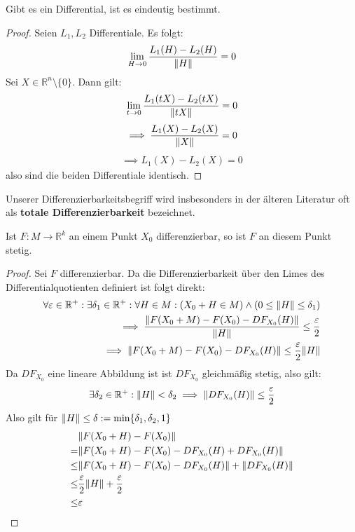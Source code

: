\documentclass{report}
\renewcommand\epsilon{\varepsilon}
\newcommand{\tbf}[1]{\textbf{#1}}
\newcommand{\bR}{\mathbb{R}}
\begin{document}
\begin{theorem}
 Gibt es ein Differential, ist es eindeutig bestimmt.
\end{theorem}
\begin{proof}
 Seien $L_1, L_2$ Differentiale. Es folgt:
 \begin{align*}
  \lim_{H \to 0} \frac{L_1(H) - L_2(H)}{\norm{H}} = 0
 \end{align*}
 Sei $X \in \bR^n \setminus \{0\}$. Dann gilt:
 \begin{align*}
  \lim_{t \to 0} \frac{L_1(tX) - L_2(tX)}{\norm{tX}} = 0
 \end{align*}
 \begin{align*}
  \implies \frac{L_1(X) - L_2(X)}{\norm{X}} = 0
 \end{align*}
 \begin{align*}
  \implies L_1(X) - L_2(X) = 0
 \end{align*}
 also sind die beiden Differentiale identisch.
\end{proof}
\begin{anmerkung}
 Unserer Differenzierbarkeitsbegriff wird insbesonders in der älteren Literatur oft als \tbf{totale Differenzierbarkeit} bezeichnet.
\end{anmerkung}
\begin{theorem}
 Ist $F: M \to \bR^k$ an einem Punkt $X_0$ differenzierbar, so ist $F$ an diesem Punkt stetig.
\end{theorem}
\begin{proof}
 Sei $F$ differenzierbar. Da die Differenzierbarkeit über den Limes des Differentialquotienten definiert ist folgt direkt:
 \begin{align*}
  \forall \epsilon \in \bR^+ : \exists \delta_1 \in \bR^+ : \forall H \in M : (X_0 + H \in M) \wedge (0 \leq \norm{H} \leq \delta_1)\\ 
  \implies \frac{\norm{F(X_0 + M) - F(X_0) - DF_{X_0}(H)}}{\norm{H}} \leq \frac{\epsilon}{2}\\
  \implies \norm{F(X_0 + M) - F(X_0) - DF_{X_0}(H)} \leq \frac{\epsilon}{2}\norm{H}\\
 \end{align*}
 Da $DF_{X_0}$ eine lineare Abbildung ist ist $DF_{X_0}$ gleichmäßig stetig, also gilt:
 \begin{align*}
  \exists \delta_2 \in \bR^+ : \norm{H} < \delta_2 \implies \norm{DF_{X_0}(H)} \leq \frac{\epsilon}{2} 
 \end{align*}
 Also gilt für $\norm{H} \leq \delta := \min\{\delta_1, \delta_2, 1\}$
 \begin{align*}
  &\norm{F(X_0 + H) - F(X_0)}\\
  = &\norm{F(X_0 + H) - F(X_0) - DF_{X_0}(H) + DF_{X_0}(H)}\\
  \leq &\norm{F(X_0 + H) - F(X_0) - DF_{X_0}(H)} + \norm{DF_{X_0}(H)}\\
  \leq &\frac{\epsilon}{2}\norm{H} + \frac{\epsilon}{2}\\
  \leq &\epsilon
 \end{align*}

\end{proof}
\end{document}
